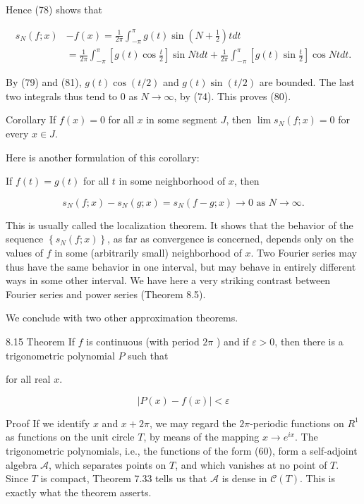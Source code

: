 \documentclass[10pt]{article}
\begin{document}
Hence (78) shows that

$$
\begin{aligned}
s_{N}(f ; x) & -f(x)=\frac{1}{2 \pi} \int_{-\pi}^{\pi} g(t) \sin \left(N+\frac{1}{2}\right) t d t \\
& =\frac{1}{2 \pi} \int_{-\pi}^{\pi}\left[g(t) \cos \frac{t}{2}\right] \sin N t d t+\frac{1}{2 \pi} \int_{-\pi}^{\pi}\left[g(t) \sin \frac{t}{2}\right] \cos N t d t .
\end{aligned}
$$

By (79) and (81), $g(t) \cos (t / 2)$ and $g(t) \sin (t / 2)$ are bounded. The last two integrals thus tend to 0 as $N \rightarrow \infty$, by (74). This proves (80).

Corollary If $f(x)=0$ for all $x$ in some segment $J$, then $\lim s_{N}(f ; x)=0$ for every $x \in J$.

Here is another formulation of this corollary:

If $f(t)=g(t)$ for all $t$ in some neighborhood of $x$, then

$$
s_{N}(f ; x)-s_{N}(g ; x)=s_{N}(f-g ; x) \rightarrow 0 \text { as } N \rightarrow \infty .
$$

This is usually called the localization theorem. It shows that the behavior of the sequence $\left\{s_{N}(f ; x)\right\}$, as far as convergence is concerned, depends only on the values of $f$ in some (arbitrarily small) neighborhood of $x$. Two Fourier series may thus have the same behavior in one interval, but may behave in entirely different ways in some other interval. We have here a very striking contrast between Fourier series and power series (Theorem 8.5).

We conclude with two other approximation theorems.

8.15 Theorem If $f$ is continuous (with period $2 \pi$ ) and if $\varepsilon>0$, then there is a trigonometric polynomial $P$ such that

for all real $x$.

$$
|P(x)-f(x)|<\varepsilon
$$

Proof If we identify $x$ and $x+2 \pi$, we may regard the $2 \pi$-periodic functions on $R^{1}$ as functions on the unit circle $T$, by means of the mapping $x \rightarrow e^{i x}$. The trigonometric polynomials, i.e., the functions of the form (60), form a self-adjoint algebra $\mathscr{A}$, which separates points on $T$, and which vanishes at no point of $T$. Since $T$ is compact, Theorem 7.33 tells us that $\mathscr{A}$ is dense in $\mathscr{C}(T)$. This is exactly what the theorem asserts.
\end{document}
